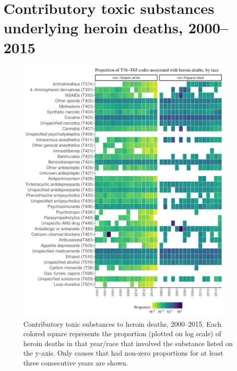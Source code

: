\documentclass[12pt, a4paper]{article}
\begin{document}
\newpage
\appendix
\section{Contributory toxic substances underlying heroin deaths, 2000--2015} \label{tetris}
\begin{figure}[h!]
\includegraphics[width=0.95\textwidth]{./plots/t_code_plot.pdf} 
 \caption{Contributory toxic substances to heroin deaths, 2000--2015. Each colored square represents the proportion (plotted on log scale) of heroin deaths in that year/race that involved the substance listed on the y-axis. Only causes that had non-zero proportions for at least three consecutive years are shown. }
 \label{fig:401}
\end{figure}


\newpage
\end{document}
